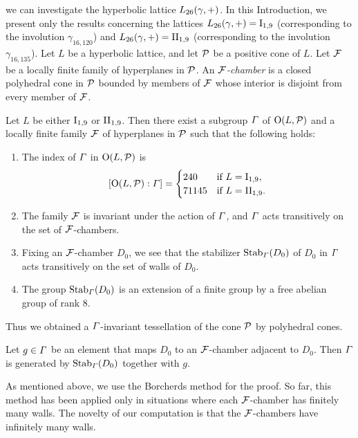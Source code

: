 \documentclass{amsart} %
\begin{document}
we can investigate %
the hyperbolic lattice $L_{26}(\gamma, +)$.
In this Introduction, 
we present only the results concerning
 the lattices $L_{26}(\gamma, +)=\mathrm{I}_{1,9}$ (corresponding to the involution $\gamma_{16,120}$) 
and $L_{26}(\gamma, +)=\mathrm{II}_{1,9}$ (corresponding to the involution $\gamma_{16,135}$).
Let $L$ be a hyperbolic lattice, 
and let $\mathord{\mathcal{P}}$ be a positive cone of $L$.
 Let $\mathord{\mathcal{F}}$ be a locally finite family of hyperplanes in $\mathord{\mathcal{P}}$. 
 An \emph{$\mathord{\mathcal{F}}$-chamber} is a closed polyhedral cone in $\mathord{\mathcal{P}}$ 
 bounded by members of $\mathord{\mathcal{F}}$ whose interior is disjoint from every member of $\mathord{\mathcal{F}}$.
%
%
\begin{theorem}\label{thm:main3}
Let $L$ be either $\mathrm{I}_{1,9}$ or $\mathrm{II}_{1,9}$. 
Then there exist a subgroup $\varGamma$ 
of $\mathord{\mathrm{O}}(L,\mathord{\mathcal{P}})$ and a locally finite family $\mathord{\mathcal{F}}$ of hyperplanes in $\mathord{\mathcal{P}}$
such that the following holds:
\begin{enumerate}[label={\rm(\roman*)}]
%
\item
The index of $\varGamma$ in $\mathord{\mathrm{O}}(L,\mathord{\mathcal{P}})$ is 
\[
[\mathord{\mathrm{O}}(L,\mathord{\mathcal{P}}): \varGamma]=\begin{cases}
240 & \textrm{if $L=\mathrm{I}_{1,9}$}, \\
71145 & \textrm{if $L=\mathrm{II}_{1,9}$}. \\
\end{cases}
\]
\item The family $\mathord{\mathcal{F}}$ is invariant under the action of $\varGamma$, 
and $\varGamma$ acts transitively on the set of $\mathord{\mathcal{F}}$-chambers.
\item Fixing an $\mathord{\mathcal{F}}$-chamber $D_0$,
we see that the stabilizer $\operatorname{Stab}_{\varGamma}(D_0)$ of $D_0$ in $\varGamma$
 acts transitively on the set of walls of $D_0$.
 \item 
 The group 
 $\operatorname{Stab}_{\varGamma}(D_0)$ is an extension of a finite group by a free abelian group of rank $8$.
\end{enumerate}
\end{theorem}
%
Thus we obtained a $\varGamma$-invariant tessellation of the cone $\mathord{\mathcal{P}}$ by polyhedral cones.
%
\begin{corollary}\label{cor:CorOfmain3}
Let $g\in\varGamma$ be an element that maps $D_0$ to an $\mathord{\mathcal{F}}$-chamber adjacent to $D_0$. 
Then $\varGamma$ is generated by $\operatorname{Stab}_{\varGamma}(D_0)$ together with $g$.
\end{corollary}
%
As mentioned above, we use the Borcherds method for the proof. 
So far, 
 this method has been applied only in situations where each $\mathord{\mathcal{F}}$-chamber has finitely many walls. 
 The novelty of our computation is that 
 the $\mathord{\mathcal{F}}$-chambers have infinitely many walls. 
%
\end{document}
